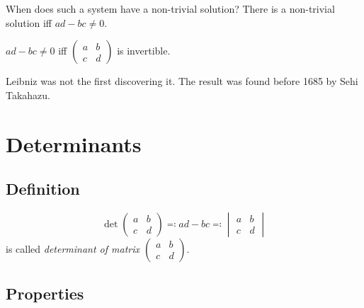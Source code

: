 \documentclass{article}
\begin{document}
When does such a system have a non-trivial solution?
There is a non-trivial solution iff $ad - bc \neq 0$.

$ad - bc \neq 0$ iff $\begin{pmatrix} a & b \\ c & d \end{pmatrix}$ is invertible.

Leibniz was not the first discovering it. The result was found before 1685 by Sehi Takahazu.

\section{Determinants}

\subsection{Definition}

\[ \det{\begin{pmatrix} a & b \\ c & d \end{pmatrix}} \eqqcolon ad - bc \eqqcolon \begin{vmatrix} a & b \\ c & d \end{vmatrix} \]
is called \emph{determinant of matrix $\begin{pmatrix} a & b \\ c & d \end{pmatrix}$}.

\subsection{Properties}
\end{document}
